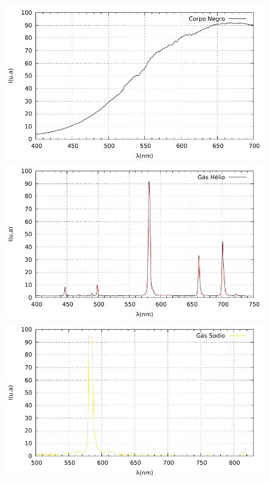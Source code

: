\begin{figure}[!htb]
	\centering
		
		\subfloat{\label{fig:BB}}\includegraphics[scale= 0.6]{fig/BB.pdf}
		\includegraphics[scale= 0.6]{fig/Helio.pdf}
		\\
		\includegraphics[scale= 0.6]{fig/Sodio.pdf}	

\end{figure}
